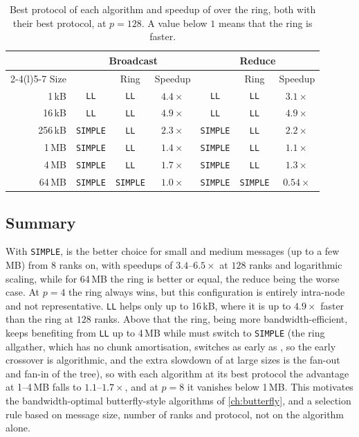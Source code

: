 \begin{table}[t]
\centering
\small
\caption{Best protocol of each algorithm and speedup of \bine{} over the ring, both with their best protocol, at $p=128$. A value below $1$ means that the ring is faster.}
\label{tab:tree-best}
\begin{tabular}{@{}r ccc @{\qquad} ccc@{}}
\toprule
 & \multicolumn{3}{c}{Broadcast} & \multicolumn{3}{c}{Reduce} \\
\cmidrule(lr){2-4}\cmidrule(l){5-7}
Size & \bine{} & Ring & Speedup & \bine{} & Ring & Speedup \\
\midrule
1\,kB   & \texttt{LL}     & \texttt{LL}     & $4.4\times$ & \texttt{LL}     & \texttt{LL}     & $3.1\times$ \\
16\,kB  & \texttt{LL}     & \texttt{LL}     & $4.9\times$ & \texttt{LL}     & \texttt{LL}     & $4.9\times$ \\
256\,kB & \texttt{SIMPLE} & \texttt{LL}     & $2.3\times$ & \texttt{SIMPLE} & \texttt{LL}     & $2.2\times$ \\
1\,MB   & \texttt{SIMPLE} & \texttt{LL}     & $1.4\times$ & \texttt{SIMPLE} & \texttt{LL}     & $1.1\times$ \\
4\,MB   & \texttt{SIMPLE} & \texttt{LL}     & $1.7\times$ & \texttt{SIMPLE} & \texttt{LL}     & $1.3\times$ \\
64\,MB  & \texttt{SIMPLE} & \texttt{SIMPLE} & $1.0\times$ & \texttt{SIMPLE} & \texttt{SIMPLE} & $0.54\times$ \\
\bottomrule
\end{tabular}
\end{table}

\subsection{Summary}

With \texttt{SIMPLE}, \bine{} is the better choice for small and medium messages (up to a few MB) from $8$ ranks on, with speedups of $3.4$--$6.5\times$ at $128$ ranks and logarithmic scaling, while for 64\,MB the ring is better or equal, the reduce being the worse case. At $p=4$ the ring always wins, but this configuration is entirely intra-node and not representative.
\texttt{LL} helps \bine{} only up to 16\,kB, where it is up to $4.9\times$ faster than the ring at $128$ ranks.
Above that the ring, being more bandwidth-efficient, keeps benefiting from \texttt{LL} up to 4\,MB while \bine{} must switch to \texttt{SIMPLE} (the ring allgather, which has no chunk amortisation, switches as early as \bine{}, so the early crossover is algorithmic, and the extra slowdown of \bine{} at large sizes is the fan-out and fan-in of the tree), so with each algorithm at its best protocol the advantage at 1--4\,MB falls to $1.1$--$1.7\times$, and at $p=8$ it vanishes below 1\,MB.
This motivates the bandwidth-optimal butterfly-style algorithms of \cref{ch:butterfly}, and a selection rule based on message size, number of ranks and protocol, not on the algorithm alone.

